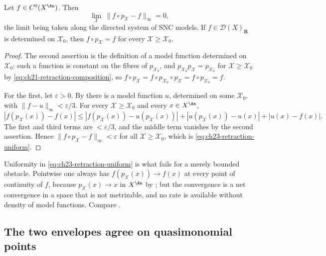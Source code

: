 \begin{lemma}
\label{lem:ch23-retraction-uniform}
Let \(f\in C^0(X^{\An})\).  Then
\begin{equation}\label{eq:ch23-retraction-uniform}
 \lim_{\mathcal X}\ \|f\circ p_{\mathcal X}-f\|_\infty=0,
\end{equation}
the limit being taken along the directed system of SNC models.  If
\(f\in\mathcal D(X)_{\mathbf R}\) is determined on \(\mathcal X_0\), then
\(f\circ p_{\mathcal X}=f\) for every \(\mathcal X\geq\mathcal X_0\).
\end{lemma}

\begin{proof}
The second assertion is the definition of a model function determined on
\(\mathcal X_0\): such a function is constant on the fibres of
\(p_{\mathcal X_0}\), and \(p_{\mathcal X_0}p_{\mathcal X}=p_{\mathcal X_0}\)
for \(\mathcal X\geq\mathcal X_0\) by
\eqref{eq:ch21-retraction-composition}, so
\(f\circ p_{\mathcal X}=f\circ p_{\mathcal X_0}\circ p_{\mathcal
X}=f\circ p_{\mathcal X_0}=f\).

For the first, let \(\varepsilon>0\).  By
 there is a model function \(u\),
determined on some \(\mathcal X_0\), with \(\|f-u\|_\infty<\varepsilon/3\).
For every \(\mathcal X\geq\mathcal X_0\) and every \(x\in X^{\An}\),
\[
 |f(p_{\mathcal X}(x))-f(x)|
 \leq|f(p_{\mathcal X}(x))-u(p_{\mathcal X}(x))|
   +|u(p_{\mathcal X}(x))-u(x)|
   +|u(x)-f(x)| .
\]
The first and third terms are \(<\varepsilon/3\), and the middle term
vanishes by the second assertion.  Hence
\(\|f\circ p_{\mathcal X}-f\|_\infty<\varepsilon\) for all
\(\mathcal X\geq\mathcal X_0\), which is
\eqref{eq:ch23-retraction-uniform}.
\end{proof}

\begin{remark}
\label{rem:ch23-retraction-uniform-scope}
Uniformity in \eqref{eq:ch23-retraction-uniform} is what fails for a merely
bounded obstacle.  Pointwise one always has
\(f(p_{\mathcal X}(x))\to f(x)\) at every point of continuity of \(f\),
because \(p_{\mathcal X}(x)\to x\) in \(X^{\An}\) by
; but the convergence is a net convergence
in a space that is not metrizable, and no rate is available without density
of model functions.  Compare
.
\end{remark}

\subsection{The two envelopes agree on quasimonomial points}
\label{sec:ch23-two-envelopes}

